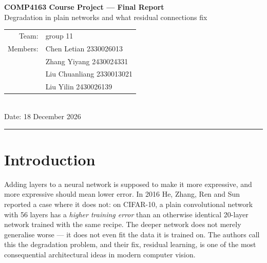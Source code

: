 \documentclass[11pt,a4paper]{article}
\newcommand{\pp}{percentage points}
\begin{document}
\begin{center}
{\Large\bfseries COMP4163 Course Project --- Final Report}\\[4pt]
{\large Degradation in plain networks and what residual connections fix}\\[8pt]
\begin{tabular}{@{}rl@{}}
Team: & group 11 \\
Members: & Chen Letian 2330026013 \\
         & Zhang Yiyang 2430024331 \\
         & Liu Chuanliang 2330013021 \\
         & Liu Yilin 2430026139 \\
\end{tabular}\\[8pt]
Date: 18 December 2026
\end{center}

\vspace{-2pt}
\noindent\rule{\textwidth}{0.4pt}

\begin{abstract}
\noindent We reproduce the CIFAR-10 degradation result of He et al.\ (2016)
with four networks and three seeds each. A plain 56-layer network has a higher
\emph{training} error than a plain 20-layer one, by 2.04 \pp{} against a seed
spread of 0.70, so the degradation is an optimisation failure and not
overfitting; adding identity shortcuts reverses the ordering, with ResNet-56
1.31 \pp{} ahead of ResNet-20 on test error. Three of the four reproduced test
errors land within 0.4 \pp{} of the paper's; the fourth, plain-56, is 1.13 \pp{}
worse, and we show that the cause is the protocol's 45{,}000-image training set
--- on all 50{,}000 images it reaches 13.06\% against the paper's 13.3\%. In an
extension we tune the initial
learning rate separately for each depth: the deeper plain network selects a rate
3.3 times smaller, refuses to train at all at 0.3 and 0.5 where the shallow one
trains normally, and remains 1.27 \pp{} behind after tuning. Tuning explains
about a third of the gap, not the gap itself.
\end{abstract}

\section{Introduction}

Adding layers to a neural network is supposed to make it more expressive, and
more expressive should mean lower error. In 2016 He, Zhang, Ren and Sun
reported a case where it does not: on CIFAR-10, a plain convolutional network
with 56 layers has a \emph{higher training error} than an otherwise identical
20-layer network trained with the same recipe. The deeper network does not
merely generalise worse --- it does not even fit the data it is trained on. The
authors call this the degradation problem, and their fix, residual learning, is
one of the most consequential architectural ideas in modern computer vision.
\end{document}
